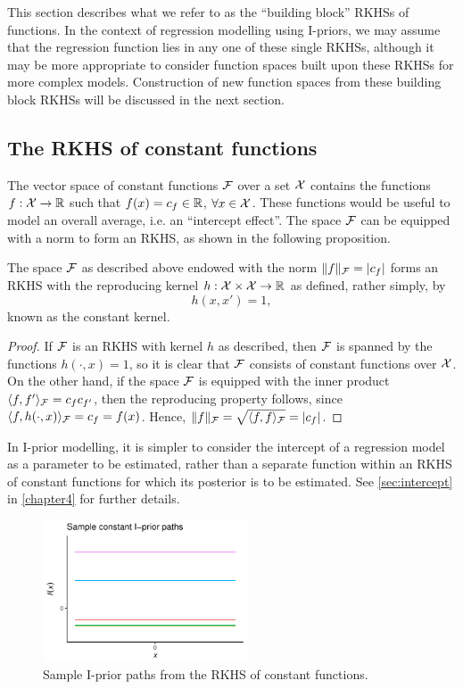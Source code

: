 This section describes what we refer to as the ``building block'' RKHSs of functions.
In the context of regression modelling using I-priors, we may assume that the regression function lies in any one of these single RKHSs, although it may be more appropriate to consider function spaces built upon these RKHSs for more complex models.
Construction of new function spaces from these building block RKHSs will be discussed in the next section.

\subsection{The RKHS of constant functions}

The vector space of constant functions ${\mathcal F}$ over a set ${\mathcal X}$ contains the functions $f:{\mathcal X} \to \mathbb{R}$ such that $f(x) = c_f \in \mathbb{R}$, $\forall x \in {\mathcal X}$.
These functions would be useful to model an overall average, i.e. an ``intercept effect''.
The space ${\mathcal F}$ can be equipped with a norm to form an RKHS, as shown in the following proposition.

\begin{proposition}
  The space ${\mathcal F}$ as described above endowed with the norm $\lVert f\rVert_{\mathcal F} = \vert c_f \vert$ forms an RKHS with the reproducing kernel $h:{\mathcal X}\times{\mathcal X}\to\mathbb{R}$ as defined, rather simply, by
  \[
    h(x,x') = 1,
  \]
  known as the constant kernel.
\end{proposition}

\begin{proof}
  If ${\mathcal F}$ is an RKHS with kernel $h$ as described, then ${\mathcal F}$ is spanned by the  functions $h(\cdot,x) = 1$, so it is clear that ${\mathcal F}$ consists of constant functions over ${\mathcal X}$.
  On the other hand, if the space ${\mathcal F}$ is equipped with the inner product $\langle f,f'\rangle_{\mathcal F} = c_f c_{f'}$, then the reproducing property follows, since $\langle f,h(\cdot,x)\rangle_{\mathcal F} = c_f = f(x)$.
  Hence, $\lVert f\rVert_{\mathcal F} = \sqrt{\langle f,f\rangle_{\mathcal F}} = \vert c_f \vert$.
\end{proof}

\begin{remark}
  In I-prior modelling, it is simpler to consider the intercept of a regression model as a parameter to be estimated, rather than a separate function within an RKHS of constant functions for which its posterior is to be estimated.
  See \cref{sec:intercept} in \cref{chapter4} for further details.  
\end{remark}

\begin{figure}[hbt]
  \centering
  \includegraphics[width=0.54\textwidth]{figure/02-kernel_path_const}
  \caption{Sample I-prior paths from the RKHS of constant functions.}
\end{figure}

